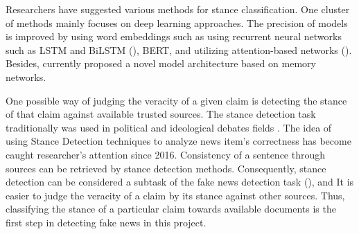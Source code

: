 Researchers have suggested various methods for stance classification. One cluster of methods mainly focuses on deep learning approaches. The precision of models is improved by using word embeddings such as using recurrent neural networks such as LSTM and BiLSTM (\cite{stanceCI}), BERT, and utilizing attention-based networks (\cite{stanceCI}). Besides, \cite{memory_network} currently proposed a novel model architecture based on memory networks.

One possible way of judging the veracity of a given claim is detecting the stance of that claim against available trusted sources. The stance detection task traditionally was used in political and ideological debates fields \citep{stance_robust}. The idea of using Stance Detection techniques to analyze news item's correctness has become caught researcher's attention since 2016. Consistency of a sentence through sources can be retrieved by stance detection methods. Consequently, stance detection can be considered a subtask of the fake news detection task (\cite{book_datafake}), and It is easier to judge  the veracity of a claim by its stance against other sources. Thus, classifying the stance of a particular claim towards available documents is the first step in detecting fake news in this project. 
